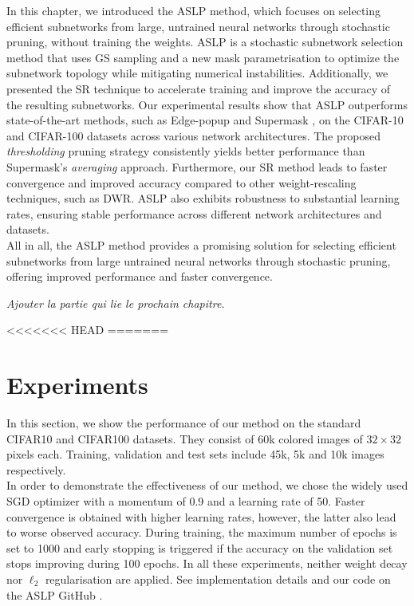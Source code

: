 In this chapter, we introduced the \acl{ASLP} method, which focuses on selecting
efficient subnetworks from large, untrained neural networks through stochastic
pruning, without training the weights. \acl{ASLP} is a stochastic subnetwork selection
method that uses \acl{GS} sampling and a new mask parametrisation to
optimize the subnetwork topology while mitigating numerical instabilities.
Additionally, we presented the \acl{SR} technique to accelerate training and
improve the accuracy of the resulting subnetworks. Our experimental results show
that ASLP outperforms state-of-the-art methods, such as Edge-popup
\cite{DBLP:conf/cvpr/RamanujanWKFR20} and Supermask
\cite{DBLP:conf/nips/ZhouLLY19}, on the CIFAR-10 and CIFAR-100 datasets across
various network architectures. The proposed \textit{thresholding} pruning
strategy consistently yields better performance than Supermask's
\textit{averaging} approach. Furthermore, our \acl{SR} method leads to faster
convergence and improved accuracy compared to other weight-rescaling techniques,
such as \acl{DWR}. \acl{ASLP} also exhibits robustness to substantial learning
rates, ensuring stable performance across different network architectures and
datasets.\\

All in all, the \acl{ASLP} method provides a promising solution for selecting
efficient subnetworks from large untrained neural networks through stochastic
pruning, offering improved performance and faster convergence. 


\textit{Ajouter la partie qui lie le prochain chapitre.}

<<<<<<< HEAD
=======

  \section{Experiments}\label{sec:experiments}
  
  In this section, we show the performance of our method on the standard CIFAR10
  and CIFAR100 datasets.   They consist of  60k  colored images of $32\times 32$
  pixels each.  Training,  validation and test sets  include  45k,  5k and 10k
  images respectively.  \\  In order to demonstrate the effectiveness of our
  method, we chose the widely used SGD optimizer with a momentum of  0.9  and a
  learning rate of 50.    Faster convergence is obtained with higher learning
  rates,   however,  the latter also lead  to worse observed accuracy.   During
  training,  the maximum number of epochs is set to 1000 and early stopping is
  triggered  if the accuracy on the validation set stops improving during 100
  epochs.   In all these experiments, neither weight decay nor $\ell_2$
  regularisation are applied. See implementation details and our code on the ASLP GitHub
  \cite{Dupont2022}.

